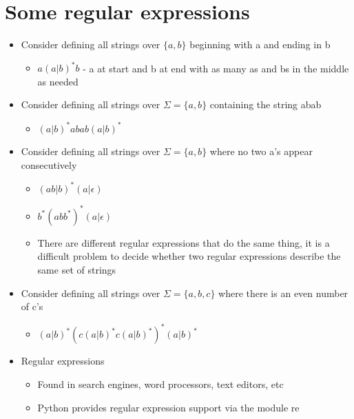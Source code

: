 \documentclass{article}[18pt]
\begin{document}
\section{Some regular expressions}
\begin{itemize}
\item Consider defining all strings over $\{a,b\}$ beginning with a and ending in b
\begin{itemize}
\item $a(a|b)^*b$ - a at start and b at end with as many as and bs in the middle as needed
\end{itemize}

\item Consider defining all strings over $\Sigma=\{a,b\}$ containing the string abab
\begin{itemize}
\item $(a|b)^*abab(a|b)^*$
\end{itemize}

\item Consider defining all strings over $\Sigma=\{a,b\}$ where no two a's appear consecutively
\begin{itemize}
\item $(ab|b)^*(a|\epsilon)$
\item $b^*(abb^*)^*(a|\epsilon)$
\item There are different regular expressions that do the same thing, it is a difficult problem to decide whether two regular expressions describe the same set of strings
\end{itemize}

\item Consider defining all strings over $\Sigma=\{a,b,c\}$ where there is an even number of c's
\begin{itemize}
\item $(a|b)^*(c(a|b)^*c(a|b)^*)^*(a|b)^*$
\end{itemize}

\item Regular expressions
\begin{itemize}
\item Found in search engines, word processors, text editors, etc
\item Python provides regular expression support via the module re
\end{itemize}
\end{itemize}
\end{document}
